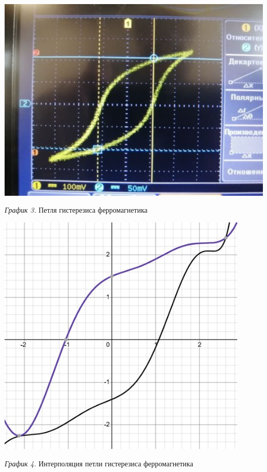\begin{center}
    \includegraphics[width=15cm]{images/petlya_1.jpg}

    \smallvspace

    \textit{График 3.} Петля гистерезиса ферромагнетика
\end{center}

\hypertarget{diagram4}{}

\begin{center}
    \includegraphics[width=12cm]{images/petlya_2.jpg}

    \smallvspace

    \textit{График 4.} Интерполяция петли гистерезиса ферромагнетика
\end{center}